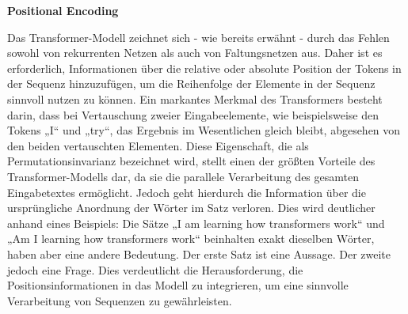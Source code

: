 

\textbf{Positional Encoding}

Das Transformer-Modell zeichnet sich - wie bereits erwähnt - durch das Fehlen sowohl von rekurrenten Netzen als auch von Faltungsnetzen aus. Daher ist es erforderlich, Informationen über die relative oder absolute Position der Tokens in der Sequenz hinzuzufügen, um die Reihenfolge der Elemente in der Sequenz sinnvoll nutzen zu können. Ein markantes Merkmal des Transformers besteht darin, dass bei Vertauschung zweier Eingabeelemente, wie beispielsweise den Tokens „I“ und „try“, das Ergebnis im Wesentlichen gleich bleibt, abgesehen von den beiden vertauschten Elementen. Diese Eigenschaft, die als Permutationsinvarianz bezeichnet wird, stellt einen der größten Vorteile des Transformer-Modells dar, da sie die parallele Verarbeitung des gesamten Eingabetextes ermöglicht. Jedoch geht hierdurch die Information über die ursprüngliche Anordnung der Wörter im Satz verloren. Dies wird deutlicher anhand eines Beispiels: Die Sätze „I am learning how transformers work“ und „Am I learning how transformers work“ beinhalten exakt dieselben Wörter, haben aber eine andere Bedeutung. Der erste Satz ist eine Aussage. Der zweite jedoch eine Frage. Dies verdeutlicht die Herausforderung, die Positionsinformationen in das Modell zu integrieren, um eine sinnvolle Verarbeitung von Sequenzen zu gewährleisten.

